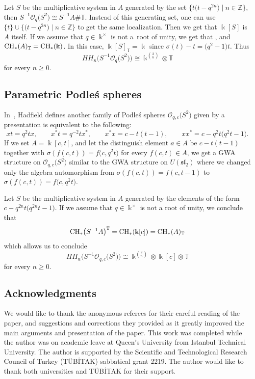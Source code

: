 \documentclass[pdftex]{sigma}
\newcommand{\G}[1]{\mathfrak{#1}}
\newcommand{\C}[1]{\mathcal{#1}}
\newcommand{\B}[1]{\mathbb{#1}}
\newcommand{\CH}{{\rm CH}}
\renewcommand{\geq}{\geqslant}
\numberwithin{equation}{section}
\begin{document}
Let $S$ be the multiplicative system in $A$ generated by the set $\big\{ t\bigl(t-q^{2n}\bigr)\mid n\in\B{Z} \big\}$,
then ${S^{-1}\C{O}_q\bigl(S^2\bigr) \cong S^{-1}A\# \B{T}}$. Instead of this generating set, one can use
$\{t\}\cup \big\{\bigl(t-q^{2n}\bigr)\mid n\in\B{Z}\big\}$ to get the same localization. Then we get that $\Bbbk[S]$
is $A$ itself. If we assume that $q\in \Bbbk^\times$ is not a~root of unity, we get that
\smash{$
 \CH_*\bigl(S^{-1}A\bigr)^{\B{T}} = \CH^{(0)}_*\bigl(\Bbbk\big[t,t^{-1}\big]\bigr)$}, and $ \CH_*(A)_{\B{T}} = \CH_*(\Bbbk)$.
In this case, $\Bbbk[S]_{\B{T}} = \Bbbk$ since $\sigma(t)-t = \bigl(q^2-1\bigr)t$. Thus
\[ HH_n\bigl(S^{-1}\C{O}_q\bigl(S^2\bigr)\bigr)
 \cong \Bbbk^{\binom{2}{n}}\otimes \B{T}
\]
for every $n\geq 0$.

\subsection{Parametric Podle\'s spheres}

In~\cite{Hadfield:Podles}, Hadfield defines another family of Podle\'s spheres
$\C{O}_{q,c}\bigl(S^2\bigr)$ given by a presentation is equivalent to the following:
\[
 x t = q^2 t x, \qquad
 x^* t = q^{-2} t x^*,\qquad
 x^*x = c - t(t - 1),\qquad
 x x^* = c - q^2 t\bigl(q^2 t -1 \bigr).
\]
If we set $A = \Bbbk[c,t]$, and let the distinguish element $a\in A$ be $c-t(t-1)$
together with $\sigma(f(c,t)) = f\bigl(c,q^2t\bigr)$ for every $f(c,t)\in A$, we get a GWA structure
on $\C{O}_{q,c}\bigl(S^2\bigr)$ similar to the GWA structure on $U(\G{sl}_2)$ where we changed only
the algebra automorphism from $\sigma(f(c,t)) = f(c,t-1)$ to $\sigma(f(c,t)) = f\bigl(c,q^2t\bigr)$.

Let $S$ be the multiplicative system in $A$ generated by the elements of the form
$c-q^{2n}t\bigl(q^{2n}t-1\bigr)$. If we assume that $q\in \Bbbk^\times$ is not a root of unity, we
conclude that
\[
 \CH_*\bigl(S^{-1}A\bigr)^{\B{T}} = \CH_*(\Bbbk[c]) = \CH_*(A)_{\B{T}}
\]
which allows us to conclude
\[
 HH_n\bigl(S^{-1}\C{O}_{q,c}\bigl(S^2\bigr)\bigr)
 \cong \Bbbk^{\binom{2}{n}}\otimes\Bbbk[c]\otimes\B{T}
\]
for every $n\geq 0$.

\subsection*{Acknowledgments}

We would like to thank the anonymous referees for their careful reading of the paper, and
suggestions and corrections they provided as it greatly improved the main arguments and
presentation of the paper. This work was completed while the author was on academic leave
at Queen's University from Istanbul Technical University. The author is supported by the
Scientific and Technological Research Council of Turkey (T\"UB\.{I}TAK) sabbatical grant 2219.
The author would like to thank both universities and T\"UB\.{I}TAK for their support.
\end{document}
